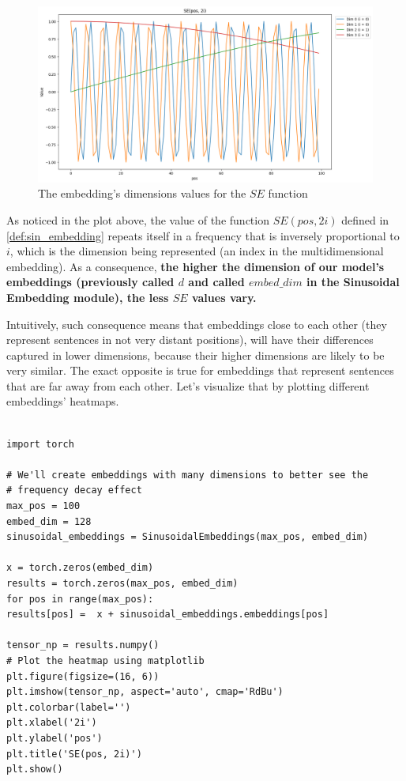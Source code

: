 \documentclass{article}
\begin{document}
\begin{figure}[h] 
	\centering
	\includegraphics[width=\linewidth]{images/sin_embeds_periodicity.png}
	\caption{The embedding's dimensions values for the $SE$ function }
	\label{fig:sin_embeds_periodicity}
\end{figure}

As noticed in the plot above, the value of the function $SE(pos, 2i)$ defined in \ref{def:sin_embedding} repeats itself in a frequency that is inversely proportional to $i$, which is the dimension being represented (an index in the multidimensional embedding). As a consequence, \textbf{the higher the dimension of our model's embeddings (previously called $d$ and called $embed\_dim$ in the Sinusoidal Embedding module), the less $SE$ values vary.} 

Intuitively, such consequence means that embeddings close to each other (they represent sentences in not very distant positions), will have their differences captured in lower dimensions, because their higher dimensions are likely to be very similar. The exact opposite is true for embeddings that represent sentences that are far away from each other. Let's visualize that by plotting different embeddings' heatmaps.


\begin{lstlisting}[caption={Generating the plot of the sinusoidal embeddings for different positions}]
	
import torch

# We'll create embeddings with many dimensions to better see the 
# frequency decay effect
max_pos = 100
embed_dim = 128
sinusoidal_embeddings = SinusoidalEmbeddings(max_pos, embed_dim)

x = torch.zeros(embed_dim)
results = torch.zeros(max_pos, embed_dim)
for pos in range(max_pos):
results[pos] =  x + sinusoidal_embeddings.embeddings[pos]

tensor_np = results.numpy()
# Plot the heatmap using matplotlib
plt.figure(figsize=(16, 6))
plt.imshow(tensor_np, aspect='auto', cmap='RdBu')
plt.colorbar(label='')
plt.xlabel('2i')
plt.ylabel('pos')
plt.title('SE(pos, 2i)')
plt.show()
\end{lstlisting}
\end{document}
